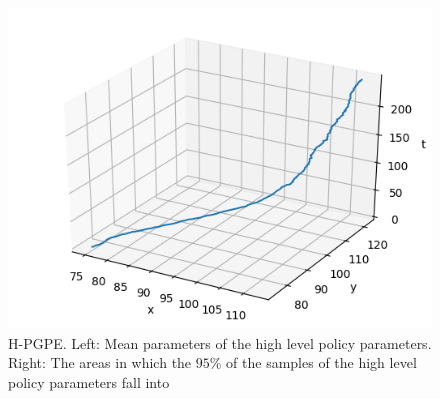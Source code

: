 \begin{figure}[t!]
	\centering
    \begin{minipage}{0.55\textwidth}
        \includegraphics[width=\textwidth]{plots/small/H-PGPE-mu.png}
    \end{minipage}
    \begin{minipage}{0.44\textwidth}
    	\setlength\figureheight{5cm}  
		\setlength\figurewidth{5cm}
			
    \end{minipage}
    \caption[H-PGPE mean value and variance in small environment]{H-PGPE. Left: Mean parameters of the high level policy parameters. Right: The areas in which the $95\%$ of the samples of the high level policy parameters fall into}    
    \label{fig:small_h_pgpe_mu_sigma}
\end{figure}


